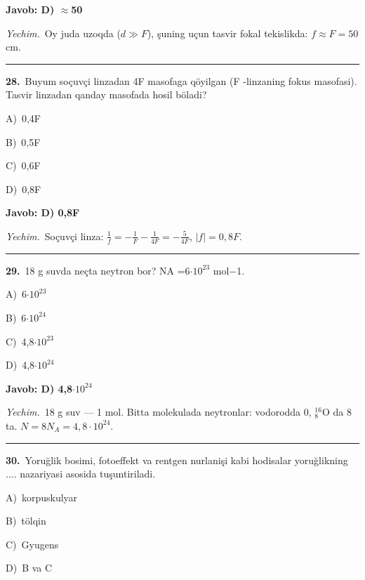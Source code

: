 \documentclass[11pt,a4paper]{article}
\newcommand{\opt}[2]{\hspace*{4mm}#1)\ #2\par}
\begin{document}
\noindent\colorbox{gray!12}{\parbox{\dimexpr\linewidth-2\fboxsep}{\textbf{Javob: D) $\approx$50}}}\par\smallskip
\noindent\textit{Yechim.}\ Oy juda uzoqda ($d\gg F$), şuning uçun tasvir fokal tekislikda: $f\approx F=50$ cm.\par\par\medskip\hrule\medskip
{}\noindent\begin{minipage}{\linewidth}
\textbf{28.}\ Buyum soçuvçi linzadan 4F masofaga qöyilgan (F -linzaning fokus masofasi). Tasvir linzadan qanday masofada hosil böladi?\par\smallskip
\opt{A}{0,4F}
\opt{B}{0,5F}
\opt{C}{0,6F}
\opt{D}{0,8F}
\end{minipage}\vspace{2pt}\par
\noindent\colorbox{gray!12}{\parbox{\dimexpr\linewidth-2\fboxsep}{\textbf{Javob: D) 0,8F}}}\par\smallskip
\noindent\textit{Yechim.}\ Soçuvçi linza: $\frac1f=-\frac1F-\frac1{4F}=-\frac{5}{4F}$, $|f|=0{,}8F$.\par\par\medskip\hrule\medskip
{}\noindent\begin{minipage}{\linewidth}
\textbf{29.}\ 18 g suvda neçta neytron bor? NA =6$\cdot10^{23}$ mol$-$1.\par\smallskip
\opt{A}{6$\cdot10^{23}$}
\opt{B}{6$\cdot10^{24}$}
\opt{C}{4,8$\cdot10^{23}$}
\opt{D}{4,8$\cdot10^{24}$}
\end{minipage}\vspace{2pt}\par
\noindent\colorbox{gray!12}{\parbox{\dimexpr\linewidth-2\fboxsep}{\textbf{Javob: D) 4,8$\cdot10^{24}$}}}\par\smallskip
\noindent\textit{Yechim.}\ 18 g suv — 1 mol. Bitta molekulada neytronlar: vodorodda 0, $^{16}_{8}$O da 8 ta. $N=8N_A=4{,}8\cdot10^{24}$.\par\par\medskip\hrule\medskip
{}\noindent\begin{minipage}{\linewidth}
\textbf{30.}\ Yoruğlik bosimi, fotoeffekt va rentgen nurlanişi kabi hodisalar yoruğlikning .... nazariyasi asosida tuşuntiriladi.\par\smallskip
\opt{A}{korpuskulyar}
\opt{B}{tölqin}
\opt{C}{Gyugens}
\opt{D}{B va C}
\end{minipage}\vspace{2pt}\par
\end{document}

